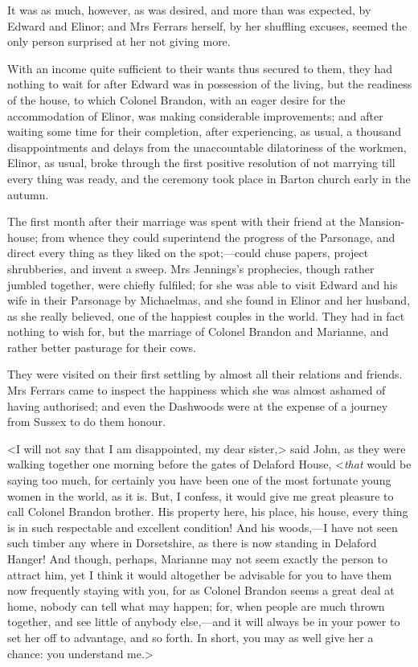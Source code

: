 It was as much, however, as was desired, and more than was expected, by Edward and Elinor; and Mrs Ferrars herself, by her shuffling excuses, seemed the only person surprised at her not giving more.

With an income quite sufficient to their wants thus secured to them, they had nothing to wait for after Edward was in possession of the living, but the readiness of the house, to which Colonel Brandon, with an eager desire for the accommodation of Elinor, was making considerable improvements; and after waiting some time for their completion, after experiencing, as usual, a thousand disappointments and delays from the unaccountable dilatoriness of the workmen, Elinor, as usual, broke through the first positive resolution of not marrying till every thing was ready, and the ceremony took place in Barton church early in the autumn.

The first month after their marriage was spent with their friend at the Mansion-house; from whence they could superintend the progress of the Parsonage, and direct every thing as they liked on the spot;—could chuse papers, project shrubberies, and invent a sweep. Mrs Jennings's prophecies, though rather jumbled together, were chiefly fulfiled; for she was able to visit Edward and his wife in their Parsonage by Michaelmas, and she found in Elinor and her husband, as she really believed, one of the happiest couples in the world. They had in fact nothing to wish for, but the marriage of Colonel Brandon and Marianne, and rather better pasturage for their cows.

They were visited on their first settling by almost all their relations and friends. Mrs Ferrars came to inspect the happiness which she was almost ashamed of having authorised; and even the Dashwoods were at the expense of a journey from Sussex to do them honour.

<I will not say that I am disappointed, my dear sister,> said John, as they were walking together one morning before the gates of Delaford House, <\textit{that} would be saying too much, for certainly you have been one of the most fortunate young women in the world, as it is. But, I confess, it would give me great pleasure to call Colonel Brandon brother. His property here, his place, his house, every thing is in such respectable and excellent condition! And his woods,—I have not seen such timber any where in Dorsetshire, as there is now standing in Delaford Hanger! And though, perhaps, Marianne may not seem exactly the person to attract him, yet I think it would altogether be advisable for you to have them now frequently staying with you, for as Colonel Brandon seems a great deal at home, nobody can tell what may happen; for, when people are much thrown together, and see little of anybody else,—and it will always be in your power to set her off to advantage, and so forth. In short, you may as well give her a chance: you understand me.>

